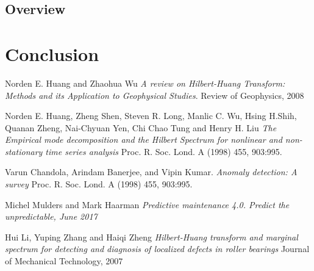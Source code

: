 \documentclass[11pt, oneside]{article}   	%
\begin{document}
\subsection{Overview}


\section{Conclusion}
\begin{thebibliography}{9}
Norden E. Huang and Zhaohua Wu 
\textit{A review on Hilbert-Huang Transform: Methods and its Application to Geophysical Studies}. 
Review of Geophysics, 2008
 
Norden E. Huang, Zheng Shen, Steven R. Long, Manlic C. Wu, Hsing H.Shih, Quanan Zheng, Nai-Chyuan Yen, Chi Chao Tung and Henry H. Liu
\textit{The Empirical mode decomposition and the Hilbert Spectrum for nonlinear and non-stationary time series analysis}
Proc. R. Soc. Lond. A (1998) 455, 903:995.

Varun Chandola, Arindam Banerjee, and Vipin Kumar.
\textit{Anomaly detection: A survey}
Proc. R. Soc. Lond. A (1998) 455, 903:995.


 
Michel Mulders and Mark Haarman
\textit{Predictive maintenance 4.0. Predict the unpredictable, June 2017}

 
Hui Li, Yuping Zhang and Haiqi Zheng
\textit{Hilbert-Huang transform and marginal spectrum for detecting and diagnosis of localized defects in roller bearings}
Journal of Mechanical Technology, 2007
\end{thebibliography}
\end{document}
